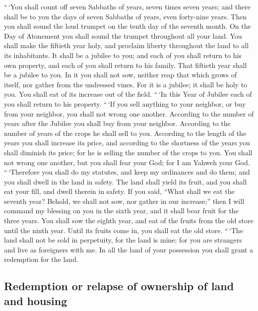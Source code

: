  ``\,`You shall count off seven Sabbaths of years, seven
times seven years; and there shall be to you the days of seven Sabbaths
of years, even forty-nine years.  Then you shall sound the
loud trumpet on the tenth day of the seventh month. On the Day of
Atonement you shall sound the trumpet throughout all your land.
 You shall make the fiftieth year holy, and proclaim
liberty throughout the land to all its inhabitants. It shall be a
jubilee to you; and each of you shall return to his own property, and
each of you shall return to his family.  That fiftieth
year shall be a jubilee to you. In it you shall not sow, neither reap
that which grows of itself, nor gather from the undressed vines.
 For it is a jubilee; it shall be holy to you. You shall
eat of its increase out of the field.  ``\,`In this Year
of Jubilee each of you shall return to his property. 
``\,`If you sell anything to your neighbor, or buy from your neighbor,
you shall not wrong one another.  According to the number
of years after the Jubilee you shall buy from your neighbor. According
to the number of years of the crops he shall sell to you.
 According to the length of the years you shall increase
its price, and according to the shortness of the years you shall
diminish its price; for he is selling the number of the crops to you.
 You shall not wrong one another, but you shall fear your
God; for I am Yahweh your God.  ``\,`Therefore you shall
do my statutes, and keep my ordinances and do them; and you shall dwell
in the land in safety.  The land shall yield its fruit,
and you shall eat your fill, and dwell therein in safety.
 If you said, ``What shall we eat the seventh year?
Behold, we shall not sow, nor gather in our increase;'' 
then I will command my blessing on you in the sixth year, and it shall
bear fruit for the three years.  You shall sow the eighth
year, and eat of the fruits from the old store until the ninth year.
Until its fruits come in, you shall eat the old store. 
``\,`The land shall not be sold in perpetuity, for the land is mine; for
you are strangers and live as foreigners with me.  In all
the land of your possession you shall grant a redemption for the land.

\hypertarget{redemption-or-relapse-of-ownership-of-land-and-housing}{%
\subsection{Redemption or relapse of ownership of land and
housing}\label{redemption-or-relapse-of-ownership-of-land-and-housing}}

